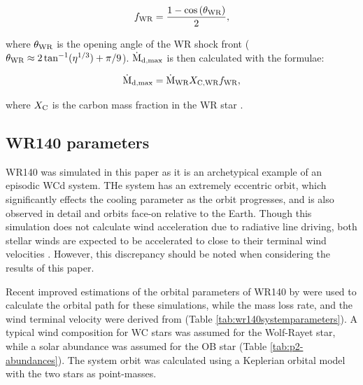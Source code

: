 \begin{equation}
  f_\text{WR} = \frac{1 - \cos\left(\theta_\text{WR}\right)}{2},
\end{equation}

\noindent
where $\theta_\text{WR}$ is the opening angle of the WR shock front ($\theta_\text{WR} \approx 2 \tan^{-1}(\eta^{1/3}) + \pi/9$).
$\dot{\text{M}}_\text{d,max}$ is then calculated with the formulae:

\begin{equation}
  \dot{\text{M}}_\text{d,max} = \dot{\text{M}}_\text{WR} X_\text{C,WR} f_\text{WR},
\end{equation}

\noindent
where $X_\text{C}$ is the carbon mass fraction in the WR star \parencite{pittardCollidingStellarWinds2018}.

\subsection{WR140 parameters}

WR140 was simulated in this paper as it is an archetypical example of an episodic WCd system.
THe system has an extremely eccentric orbit, which significantly effects the cooling parameter as the orbit progresses, and is also observed in detail and orbits face-on relative to the Earth.
Though this simulation does not calculate wind acceleration due to radiative line driving, both stellar winds are expected to be accelerated to close to their terminal wind velocities \parencite{lamersIntroductionStellarWinds1999}.
However, this discrepancy should be noted when considering the results of this paper.

Recent improved estimations of the orbital parameters of WR140 by \textcite{thomasOrbitStellarMasses2021} were used to calculate the orbital path for these simulations, while the mass loss rate, and the wind terminal velocity were derived from \textcite{williamsMultifrequencyVariationsWolfrayet1990}
(Table \ref{tab:wr140systemparameters}).
A typical wind composition for WC stars was assumed for the Wolf-Rayet star, while a solar abundance was assumed for the OB star (Table \ref{tab:p2-abundances}).
The system orbit was calculated using a Keplerian orbital model with the two stars as point-masses.

